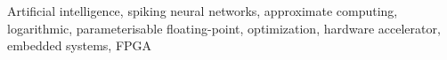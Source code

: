 
\begin{abstract}

	
\end{abstract}

\begin{IEEEkeywords}
Artificial intelligence, spiking neural networks, approximate computing, logarithmic, parameterisable floating-point, optimization, hardware accelerator, embedded systems, FPGA
\end{IEEEkeywords}
